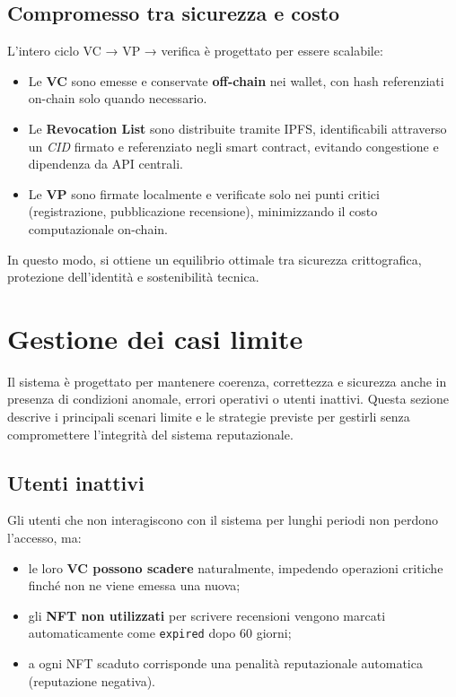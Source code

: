         \subsection{Compromesso tra sicurezza e costo}
            L'intero ciclo VC → VP → verifica è progettato per essere scalabile:
                \begin{itemize}
                    \item Le \textbf{VC} sono emesse e conservate \textbf{off-chain} nei wallet, con hash referenziati on-chain solo quando necessario.
                    
                    \item Le \textbf{Revocation List} sono distribuite tramite IPFS, identificabili attraverso un \textit{CID} firmato e referenziato negli smart contract, evitando congestione e dipendenza da API centrali.
                    
                    \item Le \textbf{VP} sono firmate localmente e verificate solo nei punti critici (registrazione, pubblicazione recensione), minimizzando il costo computazionale on-chain.
                \end{itemize}
        
            \noindent In questo modo, si ottiene un equilibrio ottimale tra sicurezza crittografica, protezione dell'identità e sostenibilità tecnica.
        
    \section{Gestione dei casi limite}
        Il sistema è progettato per mantenere coerenza, correttezza e sicurezza anche in presenza di condizioni anomale, errori operativi o utenti inattivi. Questa sezione descrive i principali scenari limite e le strategie previste per gestirli senza compromettere l'integrità del sistema reputazionale.

        \subsection{Utenti inattivi}
            Gli utenti che non interagiscono con il sistema per lunghi periodi non perdono l'accesso, ma:
                \begin{itemize}
                    \item le loro \textbf{VC possono scadere} naturalmente, impedendo operazioni critiche finché non ne viene emessa una nuova;
                    
                    \item gli \textbf{NFT non utilizzati} per scrivere recensioni vengono marcati automaticamente come \texttt{expired} dopo 60 giorni;
                    
                    \item a ogni NFT scaduto corrisponde una penalità reputazionale automatica (reputazione negativa).
                \end{itemize}
    
